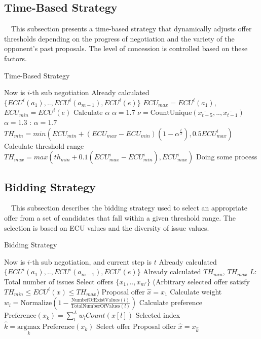 \documentclass{article}
\begin{document}
\subsection{Time-Based Strategy}
　This subsection presents a time-based strategy that dynamically adjusts offer thresholds depending on the progress of negotiation and the variety of the opponent's past proposals. The level of concession is controlled based on these factors.

\begin{algorithm}[H]
  \caption{Time-Based Strategy}
  \label{al:calc-th-range}
  \begin{algorithmic}[1]\scriptsize{
	\Require Now is $i$-th sub negotiation
	\Require Already calculated $\{ECU^i(a_1),..,ECU^i(a_{m-1}),ECU^i(e)\}$
	\Require $ECU_{max}=ECU^i(a_1)$, $ECU_{min}=ECU^i(e)$
		\Comment Calculate $\alpha$
			\State $\alpha=1.7$
		\Else
			\State $\nu=\text{CountUnique}({\overline{x_{t-5}}},..,{\overline{x_{t-1}}})$
				\State $\alpha=1.3$
			\Else:
				\State $\alpha=1.7$
			\EndIf
		\EndIf
		\State $TH_{min} = min(ECU_{min}+(ECU_{max}-ECU_{min})(1-\alpha^{\frac{t}{T}}), 0.5ECU^i_{max})$
		\Comment Calculate threshold range
		\State $TH_{max} = max(th_{min}+0.1(ECU^i_{max}-ECU^i_{min}), ECU^i_{max})$
		\State Doing some process
	\EndFor
	}\end{algorithmic}
\end{algorithm}

\subsection{Bidding Strategy}
　This subsection describes the bidding strategy used to select an appropriate offer from a set of candidates that fall within a given threshold range.
The selection is based on ECU values and the diversity of issue values.

\begin{algorithm}[H]
  \caption{Bidding Strategy}
  \label{al:bidding-strategy}
  \begin{algorithmic}[1]\scriptsize{
	\Require Now is $i$-th sub negotiation, and current step is $t$
	\Require Already calculated $\{ECU^i(a_1),..,ECU^i(a_{m-1}),ECU^i(e)\}$
	\Require Already calculated $TH_{min}$, $TH_{max}$
	\Require $L$: Total number of issues
	\State Select offers $\{x_1, .., x_{m'}\}$ (Arbitrary selected offer satisfy $TH_{min} \leq ECU^i(x) \leq TH_{max}$)
		\State Proposal offer ${\hat{x}}=x_1$
	\Else
		\Comment Calculate weight
		\State $w_l=\text{Normalize}(1-\frac{\text{NumbefOfExistValues}(l)}{\text{TotalNumberOfValues}(l)})$
		\EndFor
		\Comment Calculate preference
			\State $\text{Preference}(x_k)=\sum_l^L w_l Count(x[l])$
		\EndFor
		\State Selected index ${\hat{k}}=\underset{k}{\text{argmax}}\;\text{Preference}(x_k)$
		\Comment Select offer
		\State Proposal offer ${\hat{x}}=x_{\hat{k}}$
	\EndIf
	}\end{algorithmic}
\end{algorithm}
\end{document}
